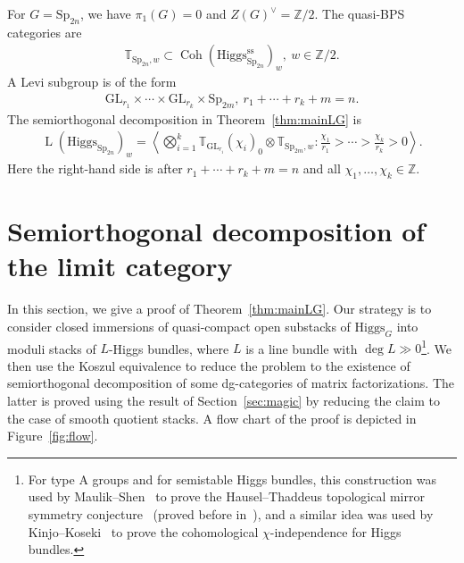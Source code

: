 \documentclass [11pt,oneside,a4paper,mathscr]{amsart}
\theoremstyle{definition}
\newcommand{\LL}{\operatorname{L}}
\newcommand{\Coh}{\operatorname{Coh}}
\newcommand{\Hig}{\mathrm{Higgs}}
\begin{document}
For $G=\mathrm{Sp}_{2n}$, we have $\pi_1(G)=0$ and $Z(G)^{\vee}=\mathbb{Z}/2$. 
The quasi-BPS categories are 
\begin{align*}
    \mathbb{T}_{\mathrm{Sp}_{2n}, w}\subset \Coh(\Hig^{\mathrm{ss}}_{\mathrm{Sp}_{2n}})_{w}, \ w\in \mathbb{Z}/2.
\end{align*}
A Levi subgroup is of the form 
\begin{align*}
\mathrm{GL}_{r_1}\times \cdots \times \mathrm{GL}_{r_k} \times \mathrm{Sp}_{2m}, \ 
r_1+\cdots+r_k+m=n.
\end{align*}
The semiorthogonal decomposition in Theorem~\ref{thm:mainLG} is 
 \begin{align*}
 \LL(\Hig_{\mathrm{Sp}_{2n}})_w=\left\langle \bigotimes_{i=1}^k \mathbb{T}_{\mathrm{GL}_{r_i}}(\chi_i)_{0} \otimes \mathbb{T}_{\mathrm{Sp}_{2m}, w} : 
 \frac{\chi_1}{r_1}>\cdots>\frac{\chi_k}{r_k}>0
 \right\rangle. 
\end{align*}
 Here the right-hand side is after $r_1+\cdots+r_k+m=n$ and 
 all $\chi_1, \ldots, \chi_k \in \mathbb{Z}$. 







\section{Semiorthogonal decomposition of the limit category}\label{sec:sodlim}
In this section, we give a proof of Theorem~\ref{thm:mainLG}. 
Our strategy is to 
consider closed immersions of quasi-compact open substacks of $\Hig_G$ into
moduli stacks of $L$-Higgs bundles, where $L$ is a line bundle with $\deg L\gg 0$\footnote{For type A groups and for semistable Higgs bundles, this construction was used by Maulik--Shen~\cite{MSendscopic} to prove the Hausel--Thaddeus topological mirror symmetry conjecture~\cite{HauTha} (proved before in~\cite{GrWy}), and a similar idea was used by Kinjo--Koseki~\cite{KinjoKoseki} to prove the cohomological $\chi$-independence for Higgs bundles.}.
We then use the Koszul equivalence to reduce the problem to the existence of semiorthogonal 
decomposition of some dg-categories of matrix factorizations. 
The latter is proved using 
the result of Section~\ref{sec:magic} by reducing the claim to the case of smooth quotient stacks. 
A flow chart of the proof is depicted in Figure~\ref{fig:flow}. 
\end{document}
